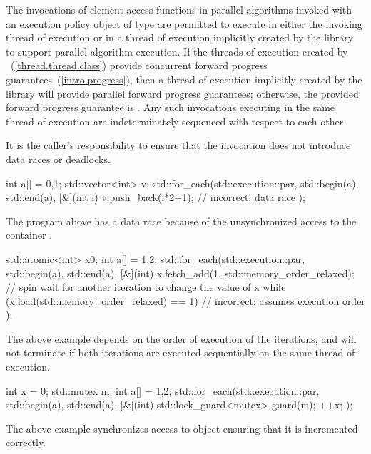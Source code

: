 \pnum
The invocations of element access functions in parallel algorithms invoked with
an execution policy object of type  are
permitted to execute in either the invoking thread of execution or in a
thread of execution implicitly
created by the library to support parallel algorithm execution.
If the threads of execution created by ~(\ref{thread.thread.class}) provide concurrent
forward progress guarantees~(\ref{intro.progress}), then a thread of execution
implicitly created by the library will provide parallel forward progress guarantees;
otherwise, the provided forward progress guarantee is
.
Any such
invocations executing in the same thread of execution are indeterminately sequenced with
respect to each other.
\begin{note}
It is the caller's responsibility to ensure that the
invocation does not introduce data races or deadlocks.
\end{note}
\begin{example}
\begin{codeblock}
int a[] = {0,1};
std::vector<int> v;
std::for_each(std::execution::par, std::begin(a), std::end(a), [&](int i) {
  v.push_back(i*2+1); // incorrect: data race
});
\end{codeblock}
The program above has a data race because of the unsynchronized access to the
container .
\end{example}
\begin{example}
\begin{codeblock}
std::atomic<int> x{0};
int a[] = {1,2};
std::for_each(std::execution::par, std::begin(a), std::end(a), [&](int) {
  x.fetch_add(1, std::memory_order_relaxed);
  // spin wait for another iteration to change the value of x
  while (x.load(std::memory_order_relaxed) == 1) { } // incorrect: assumes execution order
});
\end{codeblock}
The above example depends on the order of execution of the iterations, and
will not terminate if both iterations are executed sequentially on the same
thread of execution.
\end{example}
\begin{example}
\begin{codeblock}
int x = 0;
std::mutex m;
int a[] = {1,2};
std::for_each(std::execution::par, std::begin(a), std::end(a), [&](int) {
  std::lock_guard<mutex> guard(m);
  ++x;
});
\end{codeblock}
The above example synchronizes access to object  ensuring that it is
incremented correctly.
\end{example}

